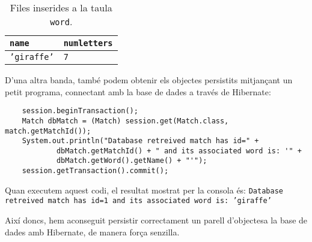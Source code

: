 \begin{table}[h]
	\begin{center}
		\begin{tabular}{|l|l|}
			\hline
			\texttt{name} & \texttt{numletters} \\
			\hline \hline
			\texttt{'giraffe'} & \texttt{7} \\
			\hline
		\end{tabular}
	\end{center}
	\caption{Files inserides a la taula \texttt{word}.}
	\label{table:selectword}
\end{table}

D'una altra banda, també podem obtenir els objectes persistits mitjançant un petit programa, connectant amb la base de dades a través de Hibernate:

\begin{verbatim}
    session.beginTransaction();
    Match dbMatch = (Match) session.get(Match.class, match.getMatchId());
    System.out.println("Database retreived match has id=" +
            dbMatch.getMatchId() + " and its associated word is: '" +
            dbMatch.getWord().getName() + "'");
    session.getTransaction().commit();
\end{verbatim}

Quan executem aquest codi, el resultat mostrat per la consola és:
\texttt{Database retreived match has id=1 and its associated word is: 'giraffe'}

Així doncs, hem aconseguit persistir correctament un parell d'objectesa la base de dades amb Hibernate, de manera força senzilla.